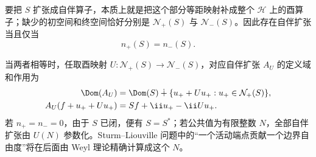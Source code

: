 \begin{theorem}
要把 $S$ 扩张成自伴算子，本质上就是把这个部分等距映射补成整个 $\mathcal H$ 上的酉算子；缺少的初空间和终空间恰好分别是 $\mathcal N_+(S)$ 与 $\mathcal N_-(S)$。因此存在自伴扩张当且仅当
\begin{equation}\label{eq:math-sl-von-neumann-index-condition}
 n_+(S)=n_-(S).
\end{equation}

当两者相等时，任取酉映射 $U:\mathcal N_+(S)\to\mathcal N_-(S)$，对应自伴扩张 $A_U$ 的定义域和作用为
\begin{equation}\label{eq:math-sl-von-neumann-extension}
\begin{aligned}
 \Dom(A_U)
 &=\Dom(S)\mathbin{\dotplus}
 \{u_++Uu_+:u_+\in\mathcal N_+(S)\},\\
 A_U(f+u_++Uu_+)
 &=Sf+\ii u_+-\ii Uu_+.
\end{aligned}
\end{equation}
若 $n_+=n_-=0$，由于 $S$ 已闭，便有 $S=S^*$；若公共值为有限整数 $N$，全部自伴扩张由 $U(N)$ 参数化。Sturm--Liouville 问题中的“一个活动端点贡献一个边界自由度”将在后面由 Weyl 理论精确计算成这个 $N$。
\end{theorem}

